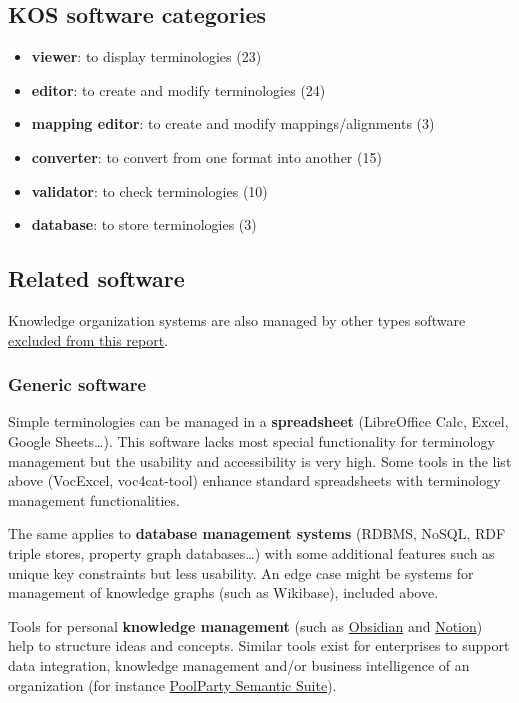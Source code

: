 \documentclass[
  DIV=10]{article}
\providecommand{\tightlist}{%
  \setlength{\itemsep}{0pt}\setlength{\parskip}{0pt}}
\begin{document}
\subsection{KOS software categories}\label{kos-software-categories}

\begin{itemize}
\tightlist
\item
  \textbf{viewer}: to display terminologies (23)
\item
  \textbf{editor}: to create and modify terminologies (24)
\item
  \textbf{mapping editor}: to create and modify mappings/alignments (3)
\item
  \textbf{converter}: to convert from one format into another (15)
\item
  \textbf{validator}: to check terminologies (10)
\item
  \textbf{database}: to store terminologies (3)
\end{itemize}

\subsection{Related software}\label{related-software}

Knowledge organization systems are also managed by other types software
\hyperref[scope]{excluded from this report}.

\subsubsection{Generic software}\label{generic-software}

Simple terminologies can be managed in a \textbf{spreadsheet}
(LibreOffice Calc, Excel, Google Sheets\ldots). This software lacks most
special functionality for terminology management but the usability and
accessibility is very high. Some tools in the list above (VocExcel,
voc4cat-tool) enhance standard spreadsheets with terminology management
functionalities.

The same applies to \textbf{database management systems} (RDBMS, NoSQL,
RDF triple stores, property graph databases\ldots) with some additional
features such as unique key constraints but less usability. An edge case
might be systems for management of knowledge graphs (such as Wikibase),
included above.

Tools for personal \textbf{knowledge management} (such as
\href{https://obsidian.md/}{Obsidian} and
\href{https://www.notion.com/}{Notion}) help to structure ideas and
concepts. Similar tools exist for enterprises to support data
integration, knowledge management and/or business intelligence of an
organization (for instance
\href{https://www.poolparty.biz/product-overview}{PoolParty Semantic
Suite}).
\end{document}
